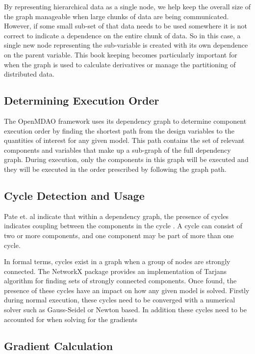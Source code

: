 \documentclass[]{aiaa-tc} %
\begin{document}
    By representing hierarchical data as a single node, we help keep the overall size of the graph manageable
    when large chunks of data are being communicated. However, if some small sub-set of that data needs to be
    used somewhere it is not correct to indicate a dependence on the entire chunk of data. So in this case, a
    single new node representing the sub-variable is created with its own dependence on the parent variable.
    This book keeping becomes particularly important for when the graph is used to calculate derivatives or
    manage the partitioning of distributed data.


    \subsection{Determining Execution Order}

    The OpenMDAO framework uses its dependency graph to determine component execution order by finding the 
    shortest path from the design variables to the quantities of interest for any given model\cite{openmdao_derivatives}. 
    This path contains the set of relevant components and variables that make up a sub-graph of the full
    dependency graph. During execution, only the components in this graph will be executed and they will be executed 
    in the order prescribed by following the graph path. 

    \subsection{Cycle Detection and Usage}
    Pate et. al indicate that within a dependency graph, the presence of cycles indicates coupling between
    the components in the cycle \cite{graph_problem2013}. A cycle can consist of two or more components, and
    one component may be part of more than one cycle.

    In formal terms, cycles exist in a graph when a group of nodes are strongly connected. The NetworkX package
    provides an implementation of Tarjans algorithm for finding sets of strongly connected
    components\cite{tarjan1972depth,nuutila1994finding}. Once found, the presence of these cycles
    have an impact on how any given model is solved. Firstly during normal execution, these cycles
    need to be converged with a numerical solver such as Gauss-Seidel or Newton based. 
    In addition these cycles need to be accounted for when solving for the gradients 

    \subsection{Gradient Calculation}
    
\end{document}
